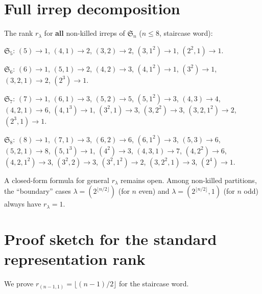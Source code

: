 \documentclass[11pt]{article}
\theoremstyle{definition}
\theoremstyle{remark}
\newcommand{\Sym}{\mathfrak{S}}
\begin{document}
\section{Full irrep decomposition}

The rank $r_\lambda$ for \textbf{all} non-killed irreps of $\Sym_n$
($n \le 8$, staircase word):

\medskip
\noindent$\Sym_5$: $(5){\to}1$, $(4,1){\to}2$, $(3,2){\to}2$,
$(3,1^2){\to}1$, $(2^2,1){\to}1$.

\noindent$\Sym_6$: $(6){\to}1$, $(5,1){\to}2$, $(4,2){\to}3$,
$(4,1^2){\to}1$, $(3^2){\to}1$, $(3,2,1){\to}2$, $(2^3){\to}1$.

\noindent$\Sym_7$: $(7){\to}1$, $(6,1){\to}3$, $(5,2){\to}5$,
$(5,1^2){\to}3$, $(4,3){\to}4$, $(4,2,1){\to}6$, $(4,1^3){\to}1$,
$(3^2,1){\to}3$, $(3,2^2){\to}3$, $(3,2,1^2){\to}2$, $(2^3,1){\to}1$.

\noindent$\Sym_8$: $(8){\to}1$, $(7,1){\to}3$, $(6,2){\to}6$,
$(6,1^2){\to}3$, $(5,3){\to}6$, $(5,2,1){\to}8$, $(5,1^3){\to}1$,
$(4^2){\to}3$, $(4,3,1){\to}7$, $(4,2^2){\to}6$, $(4,2,1^2){\to}3$,
$(3^2,2){\to}3$, $(3^2,1^2){\to}2$, $(3,2^2,1){\to}3$, $(2^4){\to}1$.

\medskip
A closed-form formula for general $r_\lambda$ remains open.
Among non-killed partitions, the ``boundary'' cases
$\lambda = (2^{\lfloor n/2\rfloor})$ (for $n$ even) and
$\lambda = (2^{\lfloor n/2\rfloor}, 1)$ (for $n$ odd) always have $r_\lambda = 1$.


\section{Proof sketch for the standard representation rank}
\label{sec:standard}

We prove $r_{(n-1,1)} = \lfloor(n-1)/2\rfloor$ for the staircase word.
\end{document}

